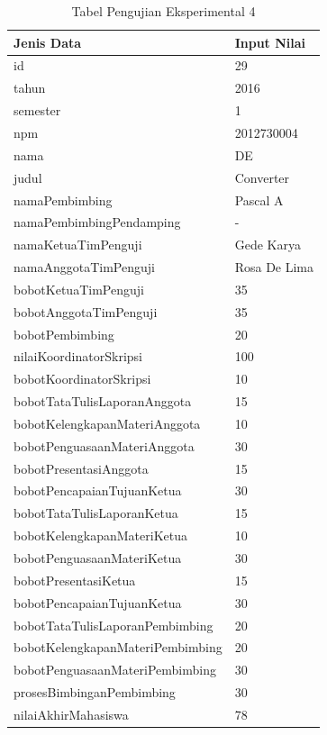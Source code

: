 	\begin{table}[H]
		\centering
		\caption{Tabel Pengujian Eksperimental 4}
		\begin{tabular}{| m{7cm} | m{5cm} |}
			\hline
			Jenis Data & Input Nilai\\
			\hline
			id & 29\\
			\hline
			tahun & 2016\\
			\hline
			semester & 1\\
			\hline
			npm & 2012730004\\
			\hline
			nama & DE\\
			\hline
			judul & Converter \\
			\hline
			namaPembimbing & Pascal A\\
			\hline
			namaPembimbingPendamping & -\\
			\hline
			namaKetuaTimPenguji & Gede Karya\\
			\hline
			namaAnggotaTimPenguji & Rosa De Lima\\
			\hline
			bobotKetuaTimPenguji & 35\\
			\hline
			bobotAnggotaTimPenguji & 35\\
			\hline
			bobotPembimbing & 20\\
			\hline
			nilaiKoordinatorSkripsi & 100\\
			\hline
			bobotKoordinatorSkripsi & 10\\
			\hline
			bobotTataTulisLaporanAnggota & 15\\
			\hline
			bobotKelengkapanMateriAnggota & 10\\
			\hline
			bobotPenguasaanMateriAnggota & 30\\
			\hline
			bobotPresentasiAnggota & 15\\
			\hline
			bobotPencapaianTujuanKetua & 30\\
			\hline
			bobotTataTulisLaporanKetua & 15\\
			\hline
			bobotKelengkapanMateriKetua & 10\\
			\hline
			bobotPenguasaanMateriKetua & 30\\
			\hline
			bobotPresentasiKetua & 15\\
			\hline
			bobotPencapaianTujuanKetua & 30\\
			\hline
			bobotTataTulisLaporanPembimbing & 20\\
			\hline
			bobotKelengkapanMateriPembimbing &20\\
			\hline
			bobotPenguasaanMateriPembimbing & 30\\
			\hline
			prosesBimbinganPembimbing & 30\\
			\hline
			nilaiAkhirMahasiswa & 78\\
			\hline
		\end{tabular}
	\end{table}
